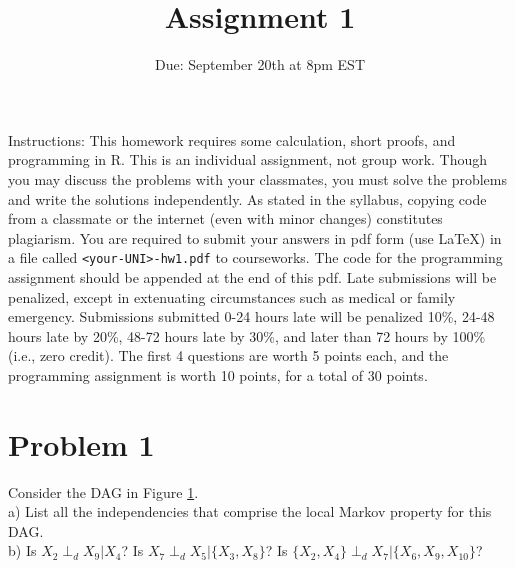 \documentclass[letterpaper]{article}
\title{Assignment 1}
\author{}
\date{Due: September 20th at 8pm EST}
\begin{document}
\maketitle

	Instructions: This homework requires some calculation, short proofs, and
	programming in R. This is an individual assignment, not group work. Though you may
	discuss the problems with your classmates, you must solve the problems and
	write the solutions independently. As stated in the syllabus, copying code
	from a classmate or the internet (even with minor changes) constitutes
	plagiarism. You are required to submit your answers in pdf form (use \LaTeX)
	in a file called \texttt{<your-UNI>-hw1.pdf} to courseworks. 
	The code for the programming assignment should be appended at the end of this pdf.
	Late submissions will be penalized, except in extenuating circumstances such
	as medical or family emergency. Submissions submitted 0-24 hours late will be
	penalized 10\%, 24-48 hours late by 20\%, 48-72 hours late by 30\%, and later
	than 72 hours by 100\% (i.e., zero credit). The first 4 questions are worth 5 points each, and the
	programming assignment is worth 10 points, for a total of 30 points.

\section*{Problem 1}

Consider the DAG in Figure \ref{fig:prob1}. \\ [3ex]
a) List all the independencies that comprise the local Markov property for this DAG. \\ [3ex]
b) Is $X_2 \perp_d X_9 | X_4$? Is $X_7 \perp_d X_5 | \{X_3, X_8 \}$? Is $ \{X_2, X_4\} \perp_d X_7 | \{X_6, X_9, X_{10} \}$?

\begin{figure}[h]
\begin{center}
\end{center}
\caption{}
\label{fig:prob1}
\end{figure}
\end{document}
